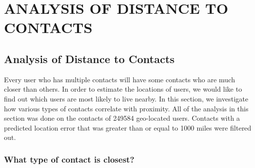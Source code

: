 \ifdefined\THESIS
    \chapter{\uppercase{Analysis of Distance to Contacts}}
\else
    \section{Analysis of Distance to Contacts}
    \label{sec:analysis}
\fi




Every user who has multiple contacts will have some contacts who are much
closer than others.
%
In order to estimate the locations of users, we would like
to find out which users are most likely to live nearby.
%
In this section, we investigate how various types of contacts correlate with
proximity.
%
All of the analysis in this section was done on the contacts of 249584
geo-located users.
%
Contacts with a predicted location error that was greater than or equal to 1000
miles were filtered out.

\subsection{What type of contact is closest?}
\label{sec:EdgeTypes}

